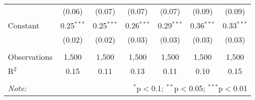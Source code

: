 \documentclass[
]{article}
\begin{document}
\begin{sidewaystable}[!htbp]
\begin{tabular}{@{\extracolsep{1pt}}lcccccc}
  & (0.06) & (0.07) & (0.07) & (0.07) & (0.09) & (0.09) \\ 
  Constant & 0.25$^{***}$ & 0.25$^{***}$ & 0.26$^{***}$ & 0.29$^{***}$ & 0.36$^{***}$ & 0.33$^{***}$ \\ 
  & (0.02) & (0.02) & (0.03) & (0.03) & (0.03) & (0.03) \\ 
 \hline \\[-1.8ex] 
Observations & 1,500 & 1,500 & 1,500 & 1,500 & 1,500 & 1,500 \\ 
R$^{2}$ & 0.15 & 0.11 & 0.13 & 0.11 & 0.10 & 0.15 \\ 
\hline 
\hline \\[-1.8ex] 
\textit{Note:}  & \multicolumn{6}{r}{$^{*}$p$<$0.1; $^{**}$p$<$0.05; $^{***}$p$<$0.01} \\ 
\end{tabular} 
\end{sidewaystable}
\end{document}
